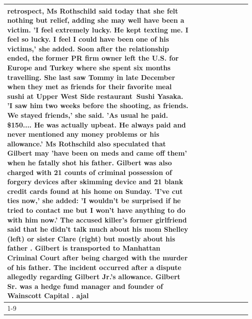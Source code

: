 \begin{table}[H]
\begin{tabular}{lllrlllll}
retrospect, Ms Rothschild said today that she felt nothing but relief, adding she may well have been a victim. 'I feel extremely lucky. He kept texting me. I feel so lucky. I feel I could have been one of his victims,' she added. Soon after the relationship ended, the former PR firm owner left the U.S. for Europe and Turkey where she spent six months  travelling. She last saw Tommy in late December when they met as friends for their favorite meal sushi at Upper West Side restaurant Sushi Yasaka. 'I saw him two weeks before the shooting, as friends. We stayed friends,' she said. 'As usual he paid. \$150.... He was actually upbeat. He always paid and never mentioned any money problems or his allowance.' Ms Rothschild also speculated that Gilbert may 'have been on meds and came off them' when he fatally shot his father. Gilbert was also charged with 21 counts of criminal possession of forgery devices after skimming device and 21 blank credit cards found at his home on Sunday. 'I've cut ties now,' she added: 'I wouldn’t be surprised if he tried to contact me but I won’t have anything to do with him now.' The accused killer's former girlfriend said that he didn't talk much about his mom Shelley (left) or sister Clare (right) but mostly about his father . Gilbert is transported to Manhattan Criminal Court  after being charged with the murder of his father. The incident occurred after a dispute allegedly regarding Gilbert Jr.'s allowance. Gilbert Sr. was a hedge fund manager and founder of Wainscott Capital . ajal \\
\cline{1-9}

\end{tabular}
\end{table}
